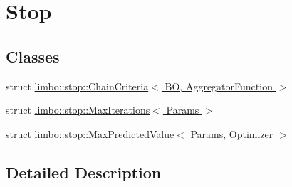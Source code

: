 \hypertarget{group__stop}{}\section{Stop}
\label{group__stop}
\subsection*{Classes}
\begin{DoxyCompactItemize}
\item 
struct \hyperlink{structlimbo_1_1stop_1_1_chain_criteria}{limbo\+::stop\+::\+Chain\+Criteria$<$ B\+O, Aggregator\+Function $>$}
\item 
struct \hyperlink{structlimbo_1_1stop_1_1_max_iterations}{limbo\+::stop\+::\+Max\+Iterations$<$ Params $>$}
\item 
struct \hyperlink{structlimbo_1_1stop_1_1_max_predicted_value}{limbo\+::stop\+::\+Max\+Predicted\+Value$<$ Params, Optimizer $>$}
\end{DoxyCompactItemize}


\subsection{Detailed Description}
